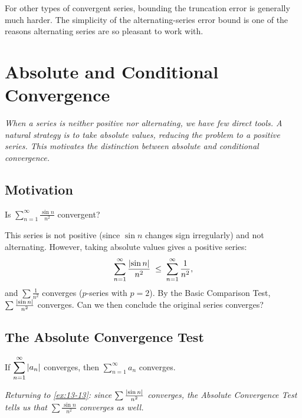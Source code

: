 \begin{remark}
For other types of convergent series, bounding the truncation error is generally much harder.  The simplicity of the alternating-series error bound is one of the reasons alternating series are so pleasant to work with.
\end{remark}

\section{Absolute and Conditional Convergence}
\label{sec:13.15}

\textit{When a series is neither positive nor alternating, we have few direct tools.  A natural strategy is to take absolute values, reducing the problem to a positive series.  This motivates the distinction between absolute and conditional convergence.}

\subsection*{Motivation}

\begin{example}
\label{ex:13-13}
Is $\displaystyle\sum_{n=1}^{\infty}\frac{\sin n}{n^{2}}$ convergent?

This series is not positive (since $\sin n$ changes sign irregularly) and not alternating.  However, taking absolute values gives a positive series:
\[
  \sum_{n=1}^{\infty}\frac{\left\lvert \sin n \right\rvert}{n^{2}} \;\le\; \sum_{n=1}^{\infty}\frac{1}{n^{2}},
\]
and $\sum\frac{1}{n^{2}}$ converges ($p$-series with $p=2$).  By the Basic Comparison Test, $\sum\frac{\left\lvert \sin n \right\rvert}{n^{2}}$ converges.  Can we then conclude the original series converges?
\end{example}

\subsection*{The Absolute Convergence Test}

\begin{theorem}
\label{thm:13-13}
If $\displaystyle\sum_{n=1}^{\infty}\left\lvert a_{n} \right\rvert$ converges, then $\displaystyle\sum_{n=1}^{\infty}a_{n}$ converges.
\end{theorem}

\textit{Returning to \cref{ex:13-13}: since $\sum\frac{\left\lvert \sin n \right\rvert}{n^{2}}$ converges, the Absolute Convergence Test tells us that $\sum\frac{\sin n}{n^{2}}$ converges as well.}

